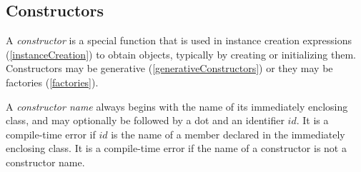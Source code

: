 \documentclass{article}
\begin{document}















\subsection{Constructors}

\LMHash{}
A {\em constructor} is a special function that is used in instance creation expressions (\ref{instanceCreation}) to obtain objects, typically by creating or initializing them.
Constructors may be generative (\ref{generativeConstructors}) or they may be factories (\ref{factories}).

\LMHash{}
A {\em constructor name} always begins with the name of its immediately enclosing class, and may optionally be followed by a dot and an identifier $id$.
It is a compile-time error if $id$ is the name of a member declared in the immediately enclosing class.
It is a compile-time error if the name of a constructor is not a constructor name.
\end{document}
